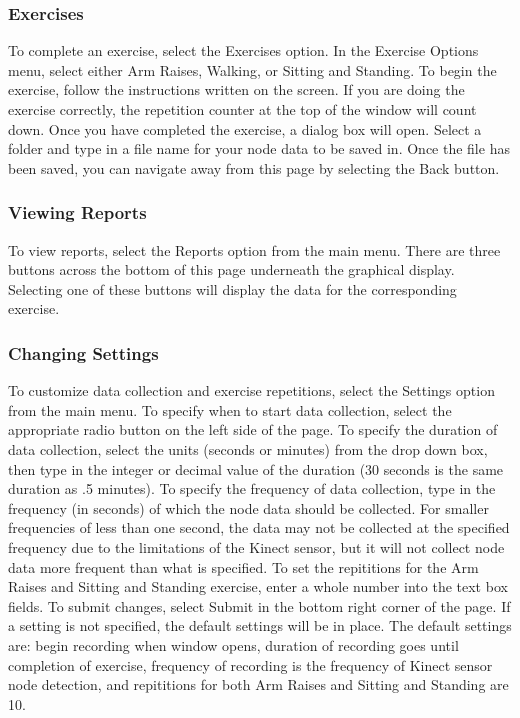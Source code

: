 \documentclass[onecolumn, draftclsnofoot,10pt, compsoc]{IEEEtran}
\begin{document}
\subsubsection{Exercises}
To complete an exercise, select the Exercises option. In the Exercise Options menu, select either Arm Raises, Walking, or Sitting and Standing. To begin the exercise, follow the instructions written on the screen. If you are doing the exercise correctly, the repetition counter at the top of the window will count down. Once you have completed the exercise, a dialog box will open. Select a folder and type in a file name for your node data to be saved in. Once the file has been saved, you can navigate away from this page by selecting the Back button.
\subsubsection{Viewing Reports}
To view reports, select the Reports option from the main menu. There are three buttons across the bottom of this page underneath the graphical display. Selecting one of these buttons will display the data for the corresponding exercise.
\subsubsection{Changing Settings}
To customize data collection and exercise repetitions, select the Settings option from the main menu. To specify when to start data collection, select the appropriate radio button on the left side of the page. To specify the duration of data collection, select the units (seconds or minutes) from the drop down box, then type in the integer or decimal value of the duration (30 seconds is the same duration as .5 minutes). To specify the frequency of data collection, type in the frequency (in seconds) of which the node data should be collected. For smaller frequencies of less than one second, the data may not be collected at the specified frequency due to the limitations of the Kinect sensor, but it will not collect node data more frequent than what is specified. To set the repititions for the Arm Raises and Sitting and Standing exercise, enter a whole number into the text box fields. To submit changes, select Submit in the bottom right corner of the page. If a setting is not specified, the default settings will be in place. The default settings are: begin recording when window opens, duration of recording goes until completion of exercise, frequency of recording is the frequency of Kinect sensor node detection, and repititions for both Arm Raises and Sitting and Standing are 10.
\end{document}
